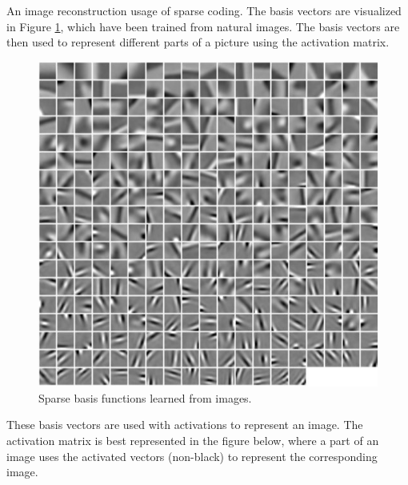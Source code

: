 \begin{ex}{}
\label{ex:scimage}
An image reconstruction usage of sparse coding. The basis vectors are visualized in Figure \ref{fig:basex}, which have been trained from natural images. The basis vectors are then used to represent different parts of a picture using the activation matrix.

\begin{figure}[H]
\centering
        \includegraphics[scale=0.20]{./figures/basisexample.jpg}
        \caption{Sparse basis functions learned from images.}
        \label{fig:basex}   
\end{figure}

These basis vectors are used with activations to represent an image. The activation matrix is best represented in the figure below, where a part of an image uses the activated vectors (non-black) to represent the corresponding image.


\end{ex}
